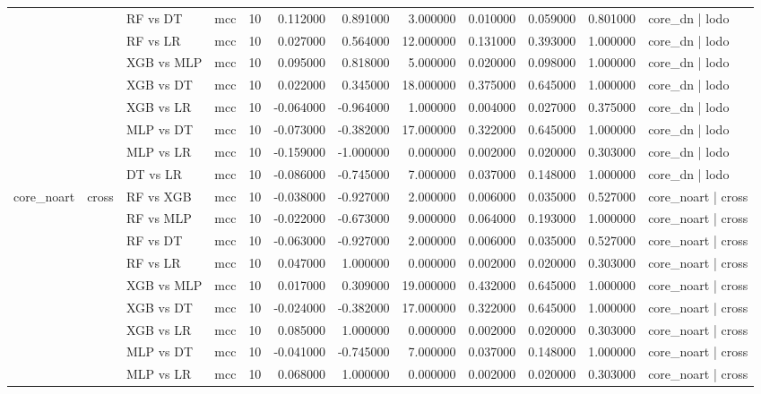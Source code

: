 \begin{tabular}{llllrrrrrrrl}
 &  & RF vs DT & mcc & 10 & 0.112000 & 0.891000 & 3.000000 & 0.010000 & 0.059000 & 0.801000 & core_dn | lodo \\
 &  & RF vs LR & mcc & 10 & 0.027000 & 0.564000 & 12.000000 & 0.131000 & 0.393000 & 1.000000 & core_dn | lodo \\
 &  & XGB vs MLP & mcc & 10 & 0.095000 & 0.818000 & 5.000000 & 0.020000 & 0.098000 & 1.000000 & core_dn | lodo \\
 &  & XGB vs DT & mcc & 10 & 0.022000 & 0.345000 & 18.000000 & 0.375000 & 0.645000 & 1.000000 & core_dn | lodo \\
 &  & XGB vs LR & mcc & 10 & -0.064000 & -0.964000 & 1.000000 & 0.004000 & 0.027000 & 0.375000 & core_dn | lodo \\
 &  & MLP vs DT & mcc & 10 & -0.073000 & -0.382000 & 17.000000 & 0.322000 & 0.645000 & 1.000000 & core_dn | lodo \\
 &  & MLP vs LR & mcc & 10 & -0.159000 & -1.000000 & 0.000000 & 0.002000 & 0.020000 & 0.303000 & core_dn | lodo \\
 &  & DT vs LR & mcc & 10 & -0.086000 & -0.745000 & 7.000000 & 0.037000 & 0.148000 & 1.000000 & core_dn | lodo \\
\cline{1-12} \cline{2-12}
\multirow[t]{20}{*}{core_noart} & \multirow[t]{10}{*}{cross} & RF vs XGB & mcc & 10 & -0.038000 & -0.927000 & 2.000000 & 0.006000 & 0.035000 & 0.527000 & core_noart | cross \\
 &  & RF vs MLP & mcc & 10 & -0.022000 & -0.673000 & 9.000000 & 0.064000 & 0.193000 & 1.000000 & core_noart | cross \\
 &  & RF vs DT & mcc & 10 & -0.063000 & -0.927000 & 2.000000 & 0.006000 & 0.035000 & 0.527000 & core_noart | cross \\
 &  & RF vs LR & mcc & 10 & 0.047000 & 1.000000 & 0.000000 & 0.002000 & 0.020000 & 0.303000 & core_noart | cross \\
 &  & XGB vs MLP & mcc & 10 & 0.017000 & 0.309000 & 19.000000 & 0.432000 & 0.645000 & 1.000000 & core_noart | cross \\
 &  & XGB vs DT & mcc & 10 & -0.024000 & -0.382000 & 17.000000 & 0.322000 & 0.645000 & 1.000000 & core_noart | cross \\
 &  & XGB vs LR & mcc & 10 & 0.085000 & 1.000000 & 0.000000 & 0.002000 & 0.020000 & 0.303000 & core_noart | cross \\
 &  & MLP vs DT & mcc & 10 & -0.041000 & -0.745000 & 7.000000 & 0.037000 & 0.148000 & 1.000000 & core_noart | cross \\
 &  & MLP vs LR & mcc & 10 & 0.068000 & 1.000000 & 0.000000 & 0.002000 & 0.020000 & 0.303000 & core_noart | cross \\

\end{tabular}
